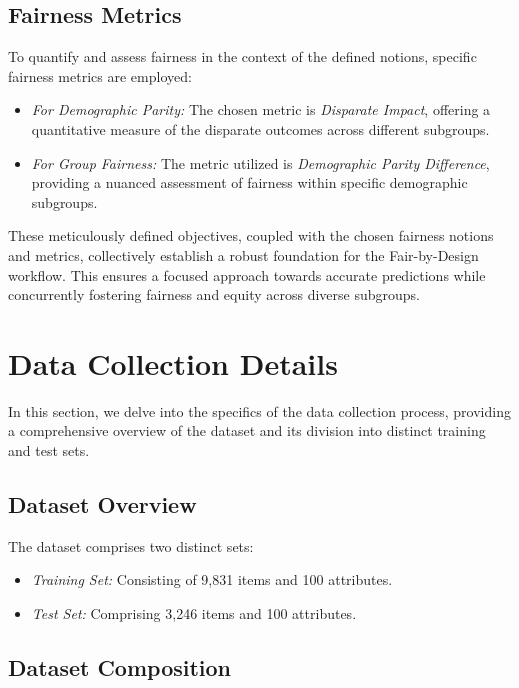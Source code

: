 \subsection{Fairness Metrics}

To quantify and assess fairness in the context of the defined notions, specific fairness metrics are employed:

\begin{itemize}
    \item \emph{For Demographic Parity:} The chosen metric is \emph{Disparate Impact}, offering a quantitative measure of the disparate outcomes across different subgroups.

    \item \emph{For Group Fairness:} The metric utilized is \emph{Demographic Parity Difference}, providing a nuanced assessment of fairness within specific demographic subgroups.
\end{itemize}

These meticulously defined objectives, coupled with the chosen fairness notions and metrics, collectively establish a robust foundation for the Fair-by-Design workflow. This ensures a focused approach towards accurate predictions while concurrently fostering fairness and equity across diverse subgroups.

\section{Data Collection Details}
\label{section:val_dc}

In this section, we delve into the specifics of the data collection process, providing a comprehensive overview of the dataset and its division into distinct training and test sets.

\subsection{Dataset Overview}

The dataset comprises two distinct sets:

\begin{itemize}
    \item \emph{Training Set:} Consisting of 9,831 items and 100 attributes.
    \item \emph{Test Set:} Comprising 3,246 items and 100 attributes.
\end{itemize}

\subsection{Dataset Composition}

